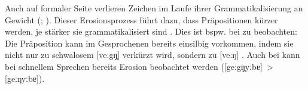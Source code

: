 Auch auf formaler Seite verlieren Zeichen im Laufe ihrer Grammatikalisierung an Gewicht (\citealp[s.][16]{Heine.1991}; \citealp[134]{Lehmann.1995}). 
Dieser Erosionsprozess führt dazu, dass Präpositionen kürzer werden, je stärker sie grammatikalisiert sind \citep[s.][66--67]{Diewald.1997}.
Dies ist bspw. bei  zu beobachten: Die Präposition kann im Gesprochenen bereits einsilbig vorkommen, indem sie nicht nur zu schwalosem [veːgŋ̩] verkürzt wird, sondern zu [veːŋ] \citep[s.][9]{Lindqvist1994}. 
Auch bei \gegenueber{} kann bei schnellem Sprechen bereits Erosion beobachtet werden ([geːgŋ̩yːbɐ]~> [geːŋyːbɐ]).

